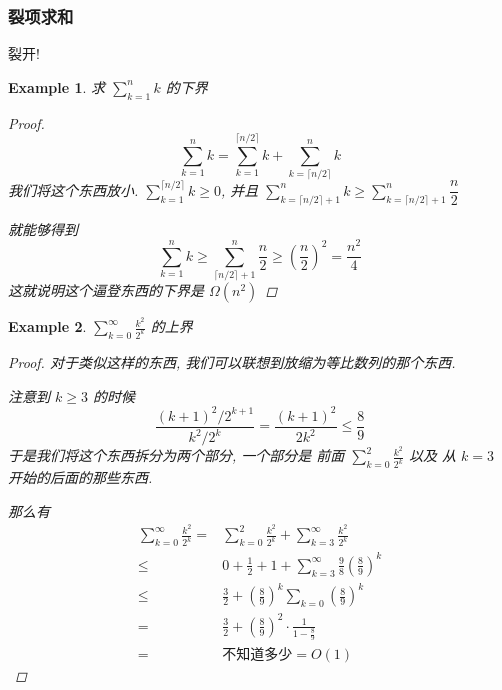 \documentclass[a4paper, 10pt]{ctexart} %
\newtheorem{example}{Example}
\begin{document}
\subsubsection{裂项求和}
裂开!
\begin{example}
    求 $\sum_{k=1} ^{n} k   $ 的下界 
    \begin{proof}
        \[
        \sum_{ k=1}  ^{n} k = \sum^{\lceil n /2\rceil } _{k=1}k + \sum_{k = \lceil n / 2\rceil} ^{n} k
        \]
        我们将这个东西放小. 
        $\displaystyle \sum_{k=1}^{\lceil n / 2 \rceil} k \ge 0 $, 并且 $\displaystyle \sum_{k= \lceil n / 2 \rceil + 1} ^{n} k \ge  \sum_{k= \lceil n / 2 \rceil + 1} ^{n} \dfrac{n}{2} $

        就能够得到 
        \[
        \sum_{k=1} ^{n} k \ge \sum_{\lceil n / 2 \rceil  +1 }^{n} \frac{n}{2} \ge \left( \frac{n}{2}\right)   ^{2}  = \frac{n^{2}}{4}
        \] 这就说明这个逼登东西的下界是 $\Omega \left(n ^{2}\right)$
    \end{proof}
\end{example}
\begin{example}
    $\sum_{k=0} ^{\infty} \frac{k^{2} }{2^{k}}$ 的上界
    \begin{proof}
        对于类似这样的东西, 我们可以联想到放缩为等比数列的那个东西. 
        
        注意到 $k \ge 3$ 的时候 
        \[
        \frac{ \left(k  +1\right) ^{2}  /  2 ^{k+1}}{ k ^{2} / 2 ^{k}}  =  
        \frac{ \left(k+1\right) ^{2} }{ 2 k^{2}} \le
        \frac{8}{9}
        \]
        于是我们将这个东西拆分为两个部分, 一个部分是 前面 $\sum_{k=0} ^{2}         \displaystyle \frac{k^{2} }{ 2 ^{k} }$ 以及 
        从 $k  =3$ 开始的后面的那些东西. 
        
        那么有 
        \begin{align*}
        \sum_{ k=0} ^{\infty} \frac{k^{2} }{2 ^{k}}  =& \sum_{k  = 0}  ^{2} \frac{k^{2} }{ 2 ^{k} } + \sum_{ k=3}  ^{\infty} \frac{k^{2} }{2^{k} } \\
        \le& 0 + \frac{1}{2} + 1   +  \sum_{k=3}  ^{\infty} \frac{9}{8} \left( \frac{8}{9}\right) ^{k}   \\
        \le& \frac{3}{2}  + \left( \frac{8}{9}\right) ^{k}\sum_{k = 0} \left( \frac{8}{9}\right) ^{k} \\
        =& \frac{3}{2} + \left( \frac{8}{9}\right) ^{2} \cdot  \frac{1}{1-  \frac{8}{9}}  \\
        =& \text{不知道多少} = O\left(1\right)
        \end{align*}
    \end{proof}
\end{example}
\end{document}
